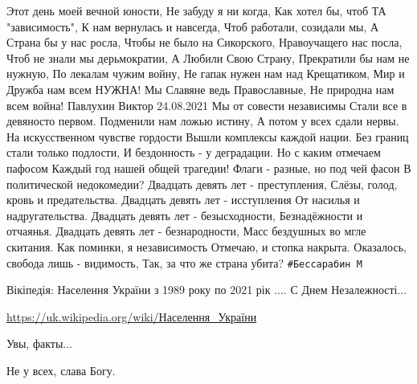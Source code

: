 \begin{itemize}
\obeycr
Этот день моей вечной юности,
Не забуду я ни когда,
Как хотел бы, чтоб ТА "зависимость",
К нам вернулась и навсегда,
Чтоб работали, созидали мы,
А Страна бы у нас росла,
Чтобы не было на Сикорского,
Нравоучащего нас посла,
Чтоб не знали мы дерьмократии,
А Любили Свою Страну,
Прекратили бы нам не нужную,
По лекалам чужим войну,
Не гапак нужен нам над Крещатиком,
Мир и Дружба нам всем НУЖНА!
Мы Славяне ведь Православные,
Не природна нам всем война!
\smallskip
Павлухин Виктор 24.08.2021
\smallskip
Мы от совести независимы
Стали все в девяносто первом.
Подменили нам ложью истину,
А потом у всех сдали нервы.
На искусственном чувстве гордости
Вышли комплексы каждой нации.
Без границ стали только подлости,
И бездонность - у деградации.
Но с каким отмечаем пафосом
Каждый год нашей общей трагедии!
Флаги - разные, но под чей фасон
В политической недокомедии?
Двадцать девять лет - преступления,
Слёзы, голод, кровь и предательства.
Двадцать девять лет - исступления
От насилья и надругательства.
Двадцать девять лет - безысходности,
Безнадёжности и отчаянья.
Двадцать девять лет - безнародности,
Масс бездушных во мгле скитания.
Как поминки, я независимость
Отмечаю, и стопка накрыта.
Оказалось, свобода лишь - видимость,
Так, за что же страна убита?
\verb|#Бессарабин М|
\restorecr

 
Вікіпедія: Населення України з 1989 року по 2021 рік ....
С Днем Незалежності...

\url{https://uk.wikipedia.org/wiki/Населення_України}

 
Увы, факты...

 
Не у всех, слава Богу.

\begin{itemize}
 

\end{itemize}
\end{itemize}
